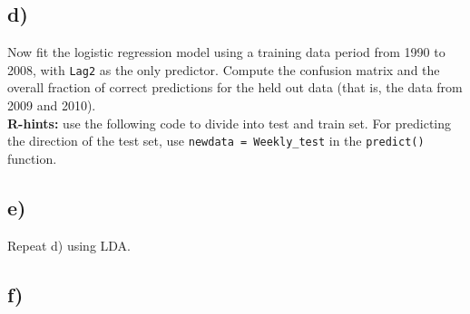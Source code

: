 \documentclass[
]{article}
\newenvironment{Shaded}{\begin{snugshade}}{\end{snugshade}}
\newcommand{\AttributeTok}[1]{\textcolor[rgb]{0.13,0.29,0.53}{#1}}
\newcommand{\DecValTok}[1]{\textcolor[rgb]{0.00,0.00,0.81}{#1}}
\newcommand{\FloatTok}[1]{\textcolor[rgb]{0.00,0.00,0.81}{#1}}
\newcommand{\FunctionTok}[1]{\textcolor[rgb]{0.13,0.29,0.53}{\textbf{#1}}}
\newcommand{\NormalTok}[1]{#1}
\newcommand{\OtherTok}[1]{\textcolor[rgb]{0.56,0.35,0.01}{#1}}
\newcommand{\SpecialCharTok}[1]{\textcolor[rgb]{0.81,0.36,0.00}{\textbf{#1}}}
\newcommand{\StringTok}[1]{\textcolor[rgb]{0.31,0.60,0.02}{#1}}
\begin{document}
\begin{Shaded}
\end{Shaded}

\subsection{d)}\label{d-1}

Now fit the logistic regression model using a training data period from
1990 to 2008, with \texttt{Lag2} as the only predictor. Compute the
confusion matrix and the overall fraction of correct predictions for the
held out data (that is, the data from 2009 and 2010).\\
\textbf{R-hints:} use the following code to divide into test and train
set. For predicting the direction of the test set, use
\texttt{newdata\ =\ Weekly\_test} in the \texttt{predict()} function.

\begin{Shaded}
\end{Shaded}

\subsection{e)}\label{e}

Repeat d) using LDA.

\subsection{f)}\label{f}
\end{document}
